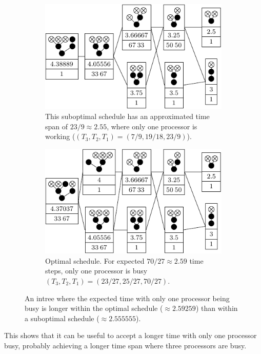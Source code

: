 \begin{figure}[ht]
  \centering
  \begin{subfigure}{.45\linewidth}
    \centering
    \includegraphics{p3/keep_1_unbusy/one_unbusy_subopt.pdf}
    \caption{This suboptimal schedule has an approximated time span of $23/9\approx 2.55$, where only one processor is working ($(T_3, T_2, T_1)=(7/9,19/18,23/9)$).}
  \end{subfigure}
  \quad
  \begin{subfigure}{.45\linewidth}
    \centering
    \includegraphics{p3/keep_1_unbusy/one_unbusy_opt.pdf}
    \caption{Optimal schedule. For expected $70/27\approx 2.59$ time steps, only one processor is busy $(T_3, T_2, T_1)=(23/27, 25/27, 70/27)$.}
  \end{subfigure}
  \caption{An intree where the expected time with only one processor being busy is longer within the optimal schedule ($\approx 2.59259$) than within a suboptimal schedule ($\approx 2.555555$).}
  \label{fig:p3-p1s-suboptimal-example}
\end{figure}

This shows that it can be useful to accept a longer time with only one processor busy, probably achieving a longer time span where three processors are busy.

